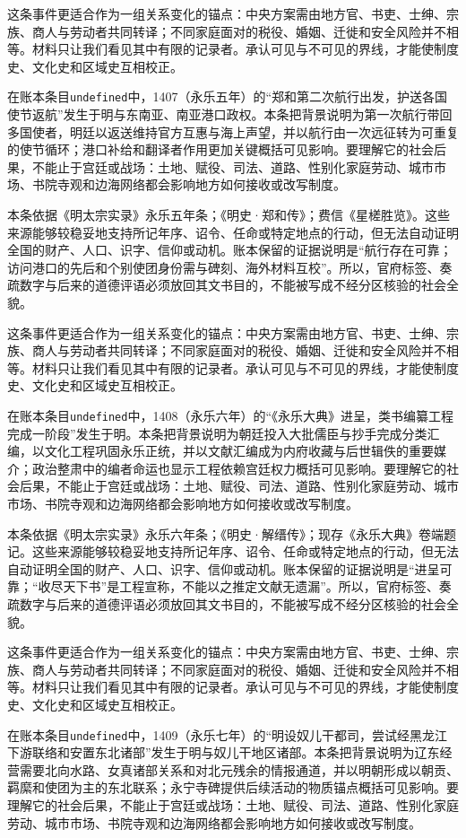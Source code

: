 这条事件更适合作为一组关系变化的锚点：中央方案需由地方官、书吏、士绅、宗族、商人与劳动者共同转译；不同家庭面对的税役、婚姻、迁徙和安全风险并不相等。材料只让我们看见其中有限的记录者。承认可见与不可见的界线，才能使制度史、文化史和区域史互相校正。

在账本条目\texttt{undefined}中，1407（永乐五年）的“郑和第二次航行出发，护送各国使节返航”发生于明与东南亚、南亚港口政权。本条把背景说明为第一次航行带回多国使者，明廷以返送维持官方互惠与海上声望，并以航行由一次远征转为可重复的使节循环；港口补给和翻译者作用更加关键概括可见影响。要理解它的社会后果，不能止于宫廷或战场：土地、赋役、司法、道路、性别化家庭劳动、城市市场、书院寺观和边海网络都会影响地方如何接收或改写制度。

本条依据《明太宗实录》永乐五年条；《明史·郑和传》；费信《星槎胜览》。这些来源能够较稳妥地支持所记年序、诏令、任命或特定地点的行动，但无法自动证明全国的财产、人口、识字、信仰或动机。账本保留的证据说明是“航行存在可靠；访问港口的先后和个别使团身份需与碑刻、海外材料互校”。所以，官府标签、奏疏数字与后来的道德评语必须放回其文书目的，不能被写成不经分区核验的社会全貌。

这条事件更适合作为一组关系变化的锚点：中央方案需由地方官、书吏、士绅、宗族、商人与劳动者共同转译；不同家庭面对的税役、婚姻、迁徙和安全风险并不相等。材料只让我们看见其中有限的记录者。承认可见与不可见的界线，才能使制度史、文化史和区域史互相校正。

在账本条目\texttt{undefined}中，1408（永乐六年）的“《永乐大典》进呈，类书编纂工程完成一阶段”发生于明。本条把背景说明为朝廷投入大批儒臣与抄手完成分类汇编，以文化工程巩固永乐正统，并以文献汇编成为内府收藏与后世辑佚的重要媒介；政治整肃中的编者命运也显示工程依赖宫廷权力概括可见影响。要理解它的社会后果，不能止于宫廷或战场：土地、赋役、司法、道路、性别化家庭劳动、城市市场、书院寺观和边海网络都会影响地方如何接收或改写制度。

本条依据《明太宗实录》永乐六年条；《明史·解缙传》；现存《永乐大典》卷端题记。这些来源能够较稳妥地支持所记年序、诏令、任命或特定地点的行动，但无法自动证明全国的财产、人口、识字、信仰或动机。账本保留的证据说明是“进呈可靠；“收尽天下书”是工程宣称，不能以之推定文献无遗漏”。所以，官府标签、奏疏数字与后来的道德评语必须放回其文书目的，不能被写成不经分区核验的社会全貌。

这条事件更适合作为一组关系变化的锚点：中央方案需由地方官、书吏、士绅、宗族、商人与劳动者共同转译；不同家庭面对的税役、婚姻、迁徙和安全风险并不相等。材料只让我们看见其中有限的记录者。承认可见与不可见的界线，才能使制度史、文化史和区域史互相校正。

在账本条目\texttt{undefined}中，1409（永乐七年）的“明设奴儿干都司，尝试经黑龙江下游联络和安置东北诸部”发生于明与奴儿干地区诸部。本条把背景说明为辽东经营需要北向水路、女真诸部关系和对北元残余的情报通道，并以明朝形成以朝贡、羁縻和使团为主的东北联系；永宁寺碑提供后续活动的物质锚点概括可见影响。要理解它的社会后果，不能止于宫廷或战场：土地、赋役、司法、道路、性别化家庭劳动、城市市场、书院寺观和边海网络都会影响地方如何接收或改写制度。

